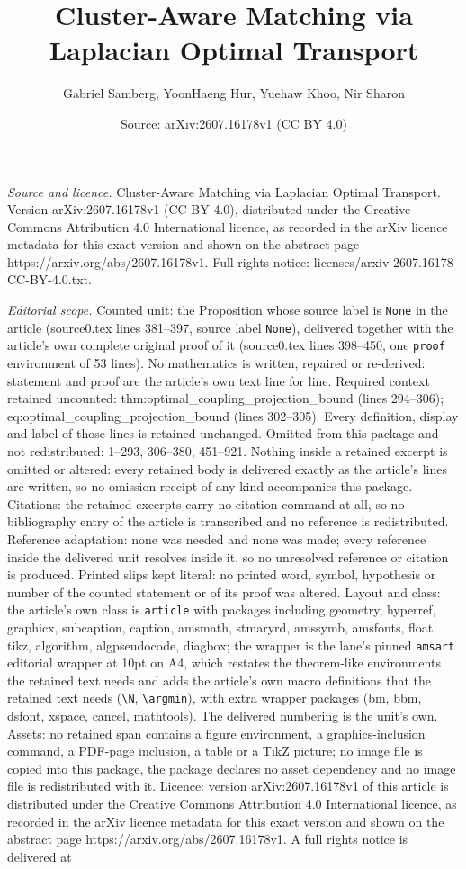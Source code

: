 \documentclass[10pt,a4paper]{amsart}
\title[Cluster-Aware Matching via Laplacian Optimal Transport]{Cluster-Aware Matching via Laplacian Optimal Transport}
\author{Gabriel Samberg, YoonHaeng Hur, Yuehaw Khoo, Nir Sharon}
\date{Source: arXiv:2607.16178v1 (CC BY 4.0)}
\begin{document}
\maketitle

\noindent\emph{Source and licence.} Cluster-Aware Matching via Laplacian Optimal Transport. Version arXiv:2607.16178v1 (CC BY 4.0), distributed under the Creative Commons Attribution 4.0 International licence, as recorded in the arXiv licence metadata for this exact version and shown on the abstract page https://arxiv.org/abs/2607.16178v1. Full rights notice: licenses/arxiv-2607.16178-CC-BY-4.0.txt.\par\smallskip

\noindent\textit{Editorial scope.} Counted unit: the Proposition whose source label is \texttt{None} in the article (source0.tex lines 381--397, source label \texttt{None}), delivered together with the article's own complete original proof of it (source0.tex lines 398--450, one \texttt{proof} environment of 53 lines). No mathematics is written, repaired or re-derived: statement and proof are the article's own text line for line. Required context retained uncounted: thm:optimal\_coupling\_projection\_bound (lines 294--306); eq:optimal\_coupling\_projection\_bound (lines 302--305). Every definition, display and label of those lines is retained unchanged. Omitted from this package and not redistributed: 1--293, 306--380, 451--921. Nothing inside a retained excerpt is omitted or altered: every retained body is delivered exactly as the article's lines are written, so no omission receipt of any kind accompanies this package. Citations: the retained excerpts carry no citation command at all, so no bibliography entry of the article is transcribed and no reference is redistributed. Reference adaptation: none was needed and none was made; every reference inside the delivered unit resolves inside it, so no unresolved reference or citation is produced. Printed slips kept literal: no printed word, symbol, hypothesis or number of the counted statement or of its proof was altered. Layout and class: the article's own class is \texttt{article} with packages including geometry, hyperref, graphicx, subcaption, caption, amsmath, stmaryrd, amssymb, amsfonts, float, tikz, algorithm, algpseudocode, diagbox; the wrapper is the lane's pinned \texttt{amsart} editorial wrapper at 10pt on A4, which restates the theorem-like environments the retained text needs and adds the article's own macro definitions that the retained text needs (\texttt{\textbackslash N}, \texttt{\textbackslash argmin}), with extra wrapper packages (bm, bbm, dsfont, xspace, cancel, mathtools). The delivered numbering is the unit's own. Assets: no retained span contains a figure environment, a graphics-inclusion command, a PDF-page inclusion, a table or a TikZ picture; no image file is copied into this package, the package declares no asset dependency and no image file is redistributed with it. Licence: version arXiv:2607.16178v1 of this article is distributed under the Creative Commons Attribution 4.0 International licence, as recorded in the arXiv licence metadata for this exact version and shown on the abstract page https://arxiv.org/abs/2607.16178v1. A full rights notice is delivered at 
\end{document}
